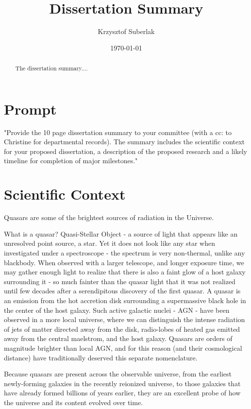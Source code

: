\documentclass[modern]{aastex62}
\begin{document}
\title{Dissertation Summary}
\author{Krzysztof Suberlak}

\date{ \today
}

\begin{abstract}
The dissertation summary.... 
\end{abstract}

\section*{Prompt}
"Provide the 10 page dissertation summary to your committee (with a cc: to Christine for
departmental records). The summary includes the scientific context for your proposed
dissertation, a description of the proposed research and a likely timeline for completion of
major milestones."

\section{Scientific Context}

Quasars are some of the brightest sources of radiation in the Universe. 

What is a quasar? Quasi-Stellar Object - a source of light that appears like an unresolved point source, a star. Yet it does not look like any star when investigated under a spectroscope - the spectrum is very non-thermal,  unlike any blackbody. When observed with a larger telescope, and longer exposure time, we may gather enough light to realize that there is also a faint glow of a host galaxy  surrounding it - so much fainter than the quasar light that it was not realized until few decades after a serendipitous discovery of the first quasar. A quasar is an emission from the hot accretion disk surrounding a supermassive black hole in the center of the host galaxy.  Such active galactic nuclei - AGN - have been observed in a more local universe, where we can distinguish the intense radiation of  jets of matter directed away from the disk, radio-lobes of heated gas emitted away from the central maelstrom, and the host galaxy. Quasars are orders of magnitude brighter than local AGN, and for this reason (and their cosmological distance) have traditionally deserved this separate nomenclature.

Because quasars are present across the observable universe, from the earliest newly-forming galaxies in the recently reionized universe, to those galaxies that have already formed billions of years earlier, they are an excellent probe of how the universe and its content evolved over time. 
\end{document}
